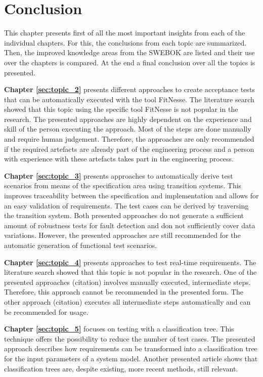 \chapter{Conclusion} \label{chap:conclusion}

This chapter presents first of all the most important insights from each of the individual chapters. For this, the conclusions from each topic are summarized. Then, the improved knowledge areas from the SWEBOK are listed and their use over the chapters is compared. At the end a final conclusion over all the topics is presented.

\textbf{Chapter \ref{sec:topic_2}} presents different approaches to create acceptance tests that can be automatically executed with the tool FitNesse. The literature search showed that this topic using the specific tool FitNesse is not popular in the research. The presented approaches are highly dependent on the experience and skill of the person executing the approach. Most of the steps are done manually and require human judgement. Therefore, the approaches are only recommended if the required artefacts are already part of the engineering process and a person with experience with these artefacts takes part in the engineering process.

\textbf{Chapter \ref{sec:topic_3}} presents approaches to automatically derive test scenarios from means of the specification area using transition systems. This improves traceability between the specification and implementation and allows for an easy validation of requirements. The test cases can be derived by traversing the transition system. Both presented approaches do not generate a sufficient amount of robustness tests for fault detection and don not sufficiently cover data variations. However, the presented approaches are still recommended for the automatic generation of functional test scenarios.

\textbf{Chapter \ref{sec:topic_4}} presents approaches to test real-time requirements. The literature search showed that this topic is not popular in the research. One of the presented approaches (citation) involves manually executed, intermediate steps. Therefore, this approach cannot be recommended in the presented form. The other approach (citation) executes all intermediate steps automatically and can be recommended for usage.

\textbf{Chapter \ref{sec:topic_5}} focuses on testing with a classification tree. This technique offers the possibility to reduce the number of test cases. The presented approach describes how requirements can be transformed into a classification tree for the input parameters of a system model. Another presented article shows that classification trees are, despite existing, more recent methods, still relevant.

